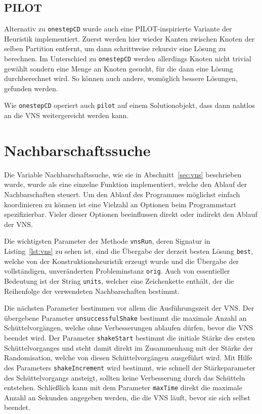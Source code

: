 \subsection{PILOT}
Alternativ zu \texttt{onestepCD} wurde auch eine PILOT-inspirierte Variante der Heuristik implementiert. Zuerst werden hier wieder Kanten zwischen Knoten der selben Partition entfernt, um dann schrittweise rekursiv eine Lösung zu berechnen. Im Unterschied zu \texttt{onestepCD} werden allerdings Knoten nicht trivial gewählt sondern eine Menge an Knoten gesucht, für die dann eine Lösung durchberechnet wird. So können auch andere, womöglich bessere Lösungen, gefunden werden.

Wie \texttt{onestepCD} operiert auch \texttt{pilot} auf einem Solutionobjekt, dass dann nahtlos an die VNS weitergereicht werden kann.

\section{Nachbarschaftssuche}
\label{sec:impl:vns}

Die Variable Nachbarschaftssuche, wie sie in Abschnitt~\ref{sec:vns} beschrieben wurde, wurde als eine einzelne Funktion implementiert, welche den Ablauf der Nachbarschaften steuert. Um den Ablauf des Programmes
möglichst einfach koordinieren zu können ist eine Vielzahl an Optionen beim Programmstart spezifizierbar. Vieler dieser Optionen beeinflussen direkt oder indirekt den Ablauf der VNS. 

Die wichtigsten Parameter der Methode \texttt{vnsRun}, deren Signatur in Listing~\ref{lst:vns} zu sehen ist, sind die Übergabe der derzeit besten Lösung \texttt{best}, welche von der Konstruktionsheuristik erzeugt wurde und
die Übergabe der vollständigen, unveränderten Probleminstanz \texttt{orig}. Auch von essentieller Bedeutung ist der String \texttt{units}, welcher eine Zeichenkette enthält, der die Reihenfolge der verwendeten Nachbarschaften bestimmt. 

Die nächsten Parameter bestimmen vor allem die Ausführungszeit der VNS\@. Der übergebene Parameter \texttt{unsuccessfulShake} bestimmt die maximale Anzahl an Schüttelvorgängen, welche ohne Verbesserungen ablaufen dürfen, bevor die VNS beendet wird.
Der Parameter \texttt{shakeStart} bestimmt die initiale Stärke des ersten Schüttelvorganges und steht damit direkt im Zusammenhang mit der Stärke der Randomisation, welche von diesen Schüttelvorgängen ausgeführt wird.
Mit Hilfe des Parameters \texttt{shakeIncrement} wird bestimmt, wie schnell der Stär\-ke\-para\-me\-ter des Schüttelvorgangs ansteigt, sollten keine Verbesserung durch das Schütteln entstehen.
Schließlich kann mit dem Parameter \texttt{maxTime} direkt die maximale Anzahl an Sekunden angegeben werden, die die VNS läuft, bevor sie sich selbst beendet. 

